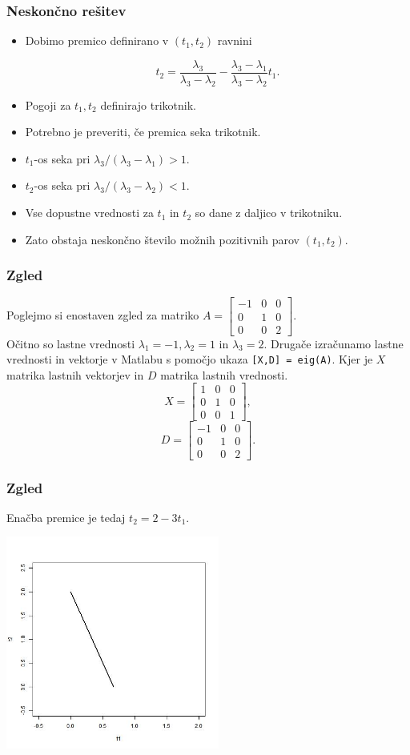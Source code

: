 \documentclass{beamer}
\begin{document}
\begin{frame}
\frametitle{Neskončno rešitev}
\begin{itemize}
\item Dobimo premico definirano v $(t_1,t_2)$ ravnini 
\begin{block}{}
$$t_2=\frac{\lambda_3}{\lambda_3 - \lambda_2} -\frac{\lambda_3 -\lambda_1}{\lambda_3 -\lambda_2}t_1.$$
\end{block}\pause
\item Pogoji za $t_1,t_2$ definirajo trikotnik.
\item Potrebno je preveriti, če premica seka trikotnik.\pause
\item $t_1$-os seka pri $\lambda_3 /(\lambda_3 -\lambda_1)>1$.
\item $t_2$-os seka  pri $\lambda_3 /(\lambda_3 - \lambda_2)<1$.\pause
\item Vse dopustne vrednosti za $t_1$ in $t_2$ so dane z daljico v trikotniku. 
\item Zato obstaja neskončno število možnih pozitivnih parov $(t_1,t_2)$.
\end{itemize}
\end{frame}
\begin{frame}
\frametitle{Zgled}
Poglejmo si enostaven zgled za matriko 
$A = \begin{bmatrix} 
-1 & 0 & 0 \\ 
0 &1 &0 \\ 
0 &0 &2  
\end{bmatrix}.$\\
Očitno so lastne vrednosti $\lambda_1=-1, \lambda_2=1$ in $\lambda_3=2$. Drugače izračunamo lastne vrednosti in vektorje v Matlabu s pomočjo ukaza \texttt{[X,D] = eig(A)}. Kjer je $X$ matrika lastnih vektorjev in $D$ matrika lastnih vrednosti.
$$X = \begin{bmatrix} 
1 & 0 & 0 \\ 
0 &1 &0 \\ 
0 &0 &1  
\end{bmatrix},$$
$$D = \begin{bmatrix} 
-1 & 0 & 0 \\ 
0 &1 &0 \\ 
0 &0 &2  
\end{bmatrix}.$$
\end{frame}
\begin{frame}
\frametitle{Zgled}
Enačba premice je tedaj $t_2=2-3t_1$.\pause
\begin{center}
\includegraphics[width=7cm]{graf1.jpg}
\end{center}
\end{frame}
\end{document}
